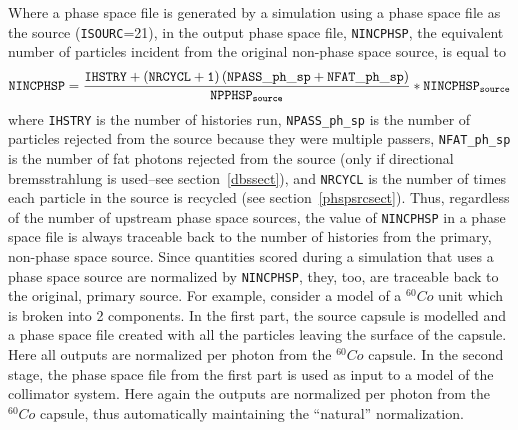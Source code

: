 \documentclass[12pt,twoside]{article}
\begin{document}
Where a phase space file is generated by a simulation using a phase space
file as the  source
(\verb+ISOURC+=21), in the output phase space file, \verb+NINCPHSP+,
the equivalent number of particles incident
from the original non-phase space source,  is equal to
\[{\tt NINCPHSP}=
\frac{{\tt IHSTRY+\left(NRCYCL+1\right)\left(NPASS\_ph\_sp+NFAT\_ph\_sp\right)}}
     {{\tt NPPHSP_{source}}}*{\tt NINCPHSP_{source}}
\]
where \verb+IHSTRY+ is the number of histories run,
{\tt NPASS\_ph\_sp} is the number of particles rejected from the source
because they were multiple passers, {\tt NFAT\_ph\_sp} is the number
of fat photons rejected from the source (only if directional bremsstrahlung
is used--see section~\ref{dbssect}), and {\tt NRCYCL} is the number
of times each particle in the source is recycled (see
section~\ref{phspsrcsect}).  Thus, regardless of the number of upstream phase
space sources, the value of \verb+NINCPHSP+ in a phase space file is always
traceable back to the number of histories from the primary, non-phase space
source.   Since quantities scored during a simulation that uses a phase space
source are normalized by \verb+NINCPHSP+, they, too, are traceable back to the
original, primary source. For example, consider a model of a $^{60}Co$ unit
which is broken into 2 components. In the first part, the source capsule
is modelled and a phase space file created with all the particles
leaving the surface of the capsule.  Here all outputs are normalized
per photon from the $^{60}Co$ capsule.  In the second stage, the phase
space file from the first part is used as input to a model of the
collimator system.  Here again the outputs are normalized per photon
from the $^{60}Co$ capsule, thus automatically maintaining the
``natural'' normalization.
\end{document}

